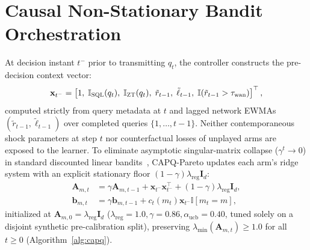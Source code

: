 \documentclass[10pt,journal,compsoc]{IEEEtran}
\begin{document}
\section{Causal Non-Stationary Bandit Orchestration}\label{sec:bandit}
At decision instant $t^-$ prior to transmitting $q_t$, the controller constructs the pre-decision context vector:
\begin{equation}
\mathbf{x}_{t^-} = \left[1,\; \mathbb{I}_{\textsc{SQL}}(q_t),\; \mathbb{I}_{\textsc{ZT}}(q_t),\; \tilde{r}_{t-1},\; \tilde{\ell}_{t-1},\; \mathbb{I}(\tilde{r}_{t-1} > \tau_{\text{wan}})\right]^\top,
\label{eq:pre_context}
\end{equation}
computed strictly from query metadata at $t$ and lagged network EWMAs $(\tilde{r}_{t-1}, \tilde{\ell}_{t-1})$ over completed queries $\{1,\dots,t-1\}$. Neither contemporaneous shock parameters at step $t$ nor counterfactual losses of unplayed arms are exposed to the learner. To eliminate asymptotic singular-matrix collapse ($\gamma^t \to 0$) in standard discounted linear bandits~\cite{li2010linucb,garivier2011discounted,russac2019dlinucb}, CAPQ-Pareto updates each arm's ridge system with an explicit stationary floor $(1-\gamma)\lambda_{\text{reg}}\mathbf{I}_d$:
\begin{align}
\mathbf{A}_{m,t} &= \gamma \mathbf{A}_{m,t-1} + \mathbf{x}_{t^-}\mathbf{x}_{t^-}^\top + (1-\gamma)\lambda_{\text{reg}}\mathbf{I}_d, \label{eq:dlin_a}\\
\mathbf{b}_{m,t} &= \gamma \mathbf{b}_{m,t-1} + c_t(m_t)\mathbf{x}_{t^-}\mathbb{I}[m_t = m], \label{eq:dlin_b}
\end{align}
initialized at $\mathbf{A}_{m,0}=\lambda_{\text{reg}}\mathbf{I}_d$ ($\lambda_{\text{reg}}=1.0, \gamma=0.86, \alpha_{\text{ucb}}=0.40$, tuned solely on a disjoint synthetic pre-calibration split), preserving $\lambda_{\min}(\mathbf{A}_{m,t}) \ge 1.0$ for all $t \ge 0$ (Algorithm~\ref{alg:capq}).
\end{document}
